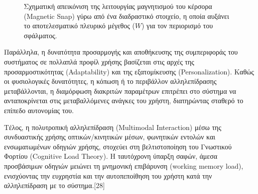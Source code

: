 \documentclass[twoside, a4paper, 11pt]{article}
\newcommand{\textlatin}[1]{\textenglish{#1}}
\begin{document}
\begin{figure}[!htbp]
\centering
{}
\caption{Σχηματική απεικόνιση της λειτουργίας μαγνητισμού του κέρσορα (Magnetic Snap) γύρω από ένα διαδραστικό στοιχείο, η οποία αυξάνει το αποτελεσματικό πλευρικό μέγεθος ($W$) για τον περιορισμό του σφάλματος.}
\label{fig:magnetic_snap}
\end{figure}


Παράλληλα, η δυνατότητα προσαρμογής και αποθήκευσης της συμπεριφοράς του συστήματος σε πολλαπλά προφίλ χρήσης βασίζεται στις αρχές της προσαρμοστικότητας (\textlatin{Adaptability}) και της εξατομίκευσης (\textlatin{Personalization}). Καθώς οι φυσιολογικές δυνατότητες, 
η κόπωση ή το περιβάλλον αλληλεπίδρασης μεταβάλλονται, η διαμόρφωση διακριτών παραμέτρων επιτρέπει στο σύστημα να ανταποκρίνεται στις μεταβαλλόμενες ανάγκες του χρήστη, διατηρώντας σταθερό το επίπεδο αυτονομίας του.

Τέλος, η πολυτροπική αλληλεπίδραση (\textlatin{Multimodal Interaction}) μέσω της συνδυαστικής χρήσης οπτικών/κινητικών μέσων, φωνητικών εντολών και ενσωματωμένων οδηγιών χρήσης, στοχεύει στη βελτιστοποίηση του Γνωστικού Φορτίου (\textlatin{Cognitive Load Theory}). 
Η ταυτόχρονη ύπαρξη σαφών, άμεσα προσβάσιμων οδηγιών μειώνει τη μνημονική επιβάρυνση (\textlatin{working memory load}), 
ενισχύοντας την ευχρηστία και την αυτοπεποίθηση του χρήστη κατά την αλληλεπίδραση με το σύστημα.[28]
\end{document}
